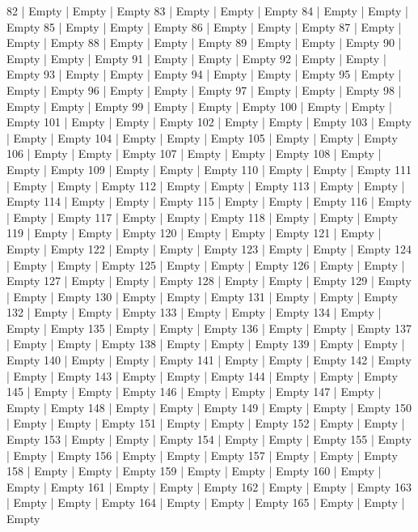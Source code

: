 82   | Empty  | Empty  | Empty
83   | Empty  | Empty  | Empty
84   | Empty  | Empty  | Empty
85   | Empty  | Empty  | Empty
86   | Empty  | Empty  | Empty
87   | Empty  | Empty  | Empty
88   | Empty  | Empty  | Empty
89   | Empty  | Empty  | Empty
90   | Empty  | Empty  | Empty
91   | Empty  | Empty  | Empty
92   | Empty  | Empty  | Empty
93   | Empty  | Empty  | Empty
94   | Empty  | Empty  | Empty
95   | Empty  | Empty  | Empty
96   | Empty  | Empty  | Empty
97   | Empty  | Empty  | Empty
98   | Empty  | Empty  | Empty
99   | Empty  | Empty  | Empty
100  | Empty  | Empty  | Empty
101  | Empty  | Empty  | Empty
102  | Empty  | Empty  | Empty
103  | Empty  | Empty  | Empty
104  | Empty  | Empty  | Empty
105  | Empty  | Empty  | Empty
106  | Empty  | Empty  | Empty
107  | Empty  | Empty  | Empty
108  | Empty  | Empty  | Empty
109  | Empty  | Empty  | Empty
110  | Empty  | Empty  | Empty
111  | Empty  | Empty  | Empty
112  | Empty  | Empty  | Empty
113  | Empty  | Empty  | Empty
114  | Empty  | Empty  | Empty
115  | Empty  | Empty  | Empty
116  | Empty  | Empty  | Empty
117  | Empty  | Empty  | Empty
118  | Empty  | Empty  | Empty
119  | Empty  | Empty  | Empty
120  | Empty  | Empty  | Empty
121  | Empty  | Empty  | Empty
122  | Empty  | Empty  | Empty
123  | Empty  | Empty  | Empty
124  | Empty  | Empty  | Empty
125  | Empty  | Empty  | Empty
126  | Empty  | Empty  | Empty
127  | Empty  | Empty  | Empty
128  | Empty  | Empty  | Empty
129  | Empty  | Empty  | Empty
130  | Empty  | Empty  | Empty
131  | Empty  | Empty  | Empty
132  | Empty  | Empty  | Empty
133  | Empty  | Empty  | Empty
134  | Empty  | Empty  | Empty
135  | Empty  | Empty  | Empty
136  | Empty  | Empty  | Empty
137  | Empty  | Empty  | Empty
138  | Empty  | Empty  | Empty
139  | Empty  | Empty  | Empty
140  | Empty  | Empty  | Empty
141  | Empty  | Empty  | Empty
142  | Empty  | Empty  | Empty
143  | Empty  | Empty  | Empty
144  | Empty  | Empty  | Empty
145  | Empty  | Empty  | Empty
146  | Empty  | Empty  | Empty
147  | Empty  | Empty  | Empty
148  | Empty  | Empty  | Empty
149  | Empty  | Empty  | Empty
150  | Empty  | Empty  | Empty
151  | Empty  | Empty  | Empty
152  | Empty  | Empty  | Empty
153  | Empty  | Empty  | Empty
154  | Empty  | Empty  | Empty
155  | Empty  | Empty  | Empty
156  | Empty  | Empty  | Empty
157  | Empty  | Empty  | Empty
158  | Empty  | Empty  | Empty
159  | Empty  | Empty  | Empty
160  | Empty  | Empty  | Empty
161  | Empty  | Empty  | Empty
162  | Empty  | Empty  | Empty
163  | Empty  | Empty  | Empty
164  | Empty  | Empty  | Empty
165  | Empty  | Empty  | Empty
